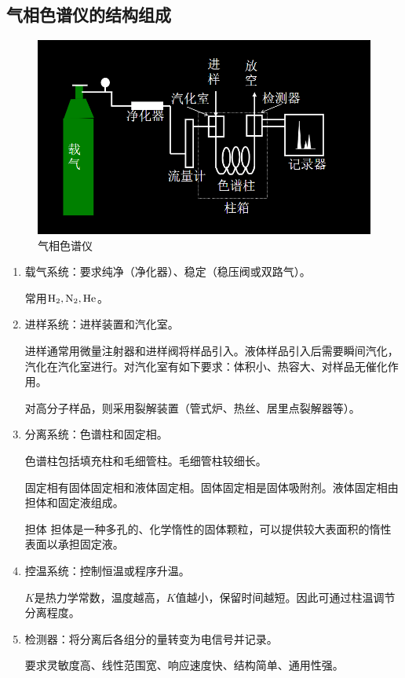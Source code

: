 \subsection{气相色谱仪的结构组成}

\begin{figure}[!h]
	\centering
	\includegraphics[width=0.7\linewidth]{image/chp1_GC_apa}
	\caption{气相色谱仪}
	\label{fig:chp1gcapa}
\end{figure}
\begin{enumerate}
	\item 载气系统：要求纯净（净化器）、稳定（稳压阀或双路气）。
	
	常用$\ce{H2,N2,He}$。
	\item 进样系统：进样装置和汽化室。
	
	进样通常用微量注射器和进样阀将样品引入。液体样品引入后需要瞬间汽化，汽化在汽化室进行。对汽化室有如下要求：体积小、热容大、对样品无催化作用。
	
	对高分子样品，则采用裂解装置（管式炉、热丝、居里点裂解器等）。
	\item 分离系统：色谱柱和固定相。
	
	色谱柱包括填充柱和毛细管柱。毛细管柱较细长。
	
	固定相有固体固定相和液体固定相。固体固定相是固体吸附剂。液体固定相由担体和固定液组成。
	
	\begin{definition*}{担体}{}
		担体是一种多孔的、化学惰性的固体颗粒，可以提供较大表面积的惰性表面以承担固定液。
	\end{definition*}
	\item 控温系统：控制恒温或程序升温。
	
	$K$是热力学常数，温度越高，$K$值越小，保留时间越短。因此可通过柱温调节分离程度。
	\item 检测器：将分离后各组分的量转变为电信号并记录。
	
	要求灵敏度高、线性范围宽、响应速度快、结构简单、通用性强。
\end{enumerate}

